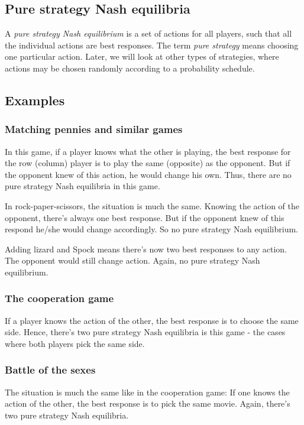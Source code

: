 \documentclass[12pt, a4paper]{article}
\begin{document}
\subsection{Pure strategy Nash equilibria}
A \textit{pure strategy Nash equilibrium} is a set of actions for all players, such that all the individual actions are best responses. The term \textit{pure strategy} means choosing one particular action. Later, we will look at other types of strategies, where actions may be chosen randomly according to a probability schedule.

\subsection{Examples}

\subsubsection{Matching pennies and similar games}
In this game, if a player knows what the other is playing, the best response for the row (column) player is to play the same (opposite) as the opponent. But if the opponent knew of this action, he would change his own. Thus, there are no pure strategy Nash equilibria in this game.

In rock-paper-scissors, the situation is much the same. Knowing the action of the opponent, there's always one best response. But if the opponent knew of this respond he/she would change accordingly. So no pure strategy Nash equilibrium.

Adding lizard and Spock means there's now two best responses to any action. The opponent would still change action. Again, no pure strategy Nash equilibrium.

\subsubsection{The cooperation game}
If a player knows the action of the other, the best response is to choose the same side. Hence, there's two pure strategy Nash equilibria is this game - the cases where both players pick the same side.

\subsubsection{Battle of the sexes}
The situation is much the same like in the cooperation game: If one knows the action of the other, the best response is to pick the same movie. Again, there's two pure strategy Nash equilibria.
\end{document}
